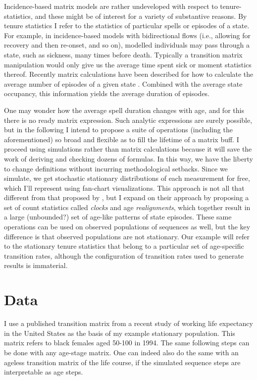 \documentclass{article}
\begin{document}
Incidence-based matrix
models are rather undeveloped with respect to tenure-statistics, and these
might be of interest for a variety of substantive reasons. By tenure statistics I
refer to the statistics of particular spells or episodes of a state. For
example, in incidence-based models with bidirectional flows (i.e., allowing for
recovery and then re-onset, and so on), modelled individuals may pass through a state,
such as sickness, many times before death. Typically a transition matrix
manipulation would only give us the average time spent sick or moment statistics
thereof. Recently matrix calculations have been described for how to calculate the average number of episodes of a given state \citep{dudel2017b}.
Combined with the average state occupancy, this information yields the average
duration of episodes.

One may wonder how the average spell duration changes with age, and for this
there is no ready matrix expression. Such analytic expressions are surely
possible, but in the following I intend to propose a suite of operations
(including the aforementioned) so broad and flexible as to fill the lifetime of
a matrix buff.
I proceed using simulations rather than matrix calculations because it will
save the work of deriving and checking dozens of formulas. In this way, we have
the liberty to change definitions without incurring methodological setbacks.
Since we simulate, we get stochastic stationary distributions of each
measurement for free, which I'll represent using fan-chart visualizations. This
approach is not all that different from that proposed by \citet{laditka1998new},
but I expand on their approach by
proposing a set of count statistics called \emph{clocks} and age
\emph{realignments}, which together result in a large (unbounded?) set of
age-like patterns of state episodes. These same operations can be used
on observed populations of sequences as well, but the key difference
is that observed populations are not stationary. Our example will refer to the
stationary tenure statistics that belong to a particular set of
age-specific transition rates, although the configuration of transition rates
used to generate results is immaterial.

\section{Data}
I use a published transition matrix from a recent
study of working life expectancy in the United States \citep{Dudel2017} as the
basis of my example stationary population.
This matrix refers to black females aged 50-100 in 1994. The same following
steps can be done with any age-stage matrix. One can indeed also do the same with
an ageless transition matrix of the life course, if the simulated sequence steps
are interpretable as age steps.
\end{document}
